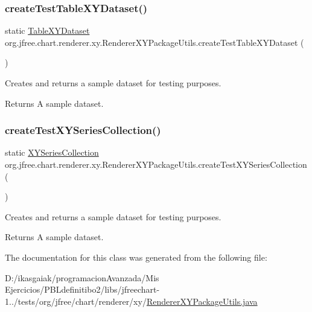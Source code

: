 \subsubsection{\texorpdfstring{create\+Test\+Table\+X\+Y\+Dataset()}{createTestTableXYDataset()}}
{\footnotesize\ttfamily static \mbox{\hyperlink{interfaceorg_1_1jfree_1_1data_1_1xy_1_1_table_x_y_dataset}{Table\+X\+Y\+Dataset}} org.\+jfree.\+chart.\+renderer.\+xy.\+Renderer\+X\+Y\+Package\+Utils.\+create\+Test\+Table\+X\+Y\+Dataset (\begin{DoxyParamCaption}{ }\end{DoxyParamCaption})\hspace{0.3cm}{\ttfamily [static]}}

Creates and returns a sample dataset for testing purposes.

\begin{DoxyReturn}{Returns}
A sample dataset. 
\end{DoxyReturn}
\mbox{\label{classorg_1_1jfree_1_1chart_1_1renderer_1_1xy_1_1_renderer_x_y_package_utils_a35efc8ca9354afb4dcedb39280bb0a60}} 
\subsubsection{\texorpdfstring{create\+Test\+X\+Y\+Series\+Collection()}{createTestXYSeriesCollection()}}
{\footnotesize\ttfamily static \mbox{\hyperlink{classorg_1_1jfree_1_1data_1_1xy_1_1_x_y_series_collection}{X\+Y\+Series\+Collection}} org.\+jfree.\+chart.\+renderer.\+xy.\+Renderer\+X\+Y\+Package\+Utils.\+create\+Test\+X\+Y\+Series\+Collection (\begin{DoxyParamCaption}{ }\end{DoxyParamCaption})\hspace{0.3cm}{\ttfamily [static]}}

Creates and returns a sample dataset for testing purposes.

\begin{DoxyReturn}{Returns}
A sample dataset. 
\end{DoxyReturn}


The documentation for this class was generated from the following file\+:\begin{DoxyCompactItemize}
\item 
D\+:/ikasgaiak/programacion\+Avanzada/\+Mis Ejercicios/\+P\+B\+Ldefinitibo2/libs/jfreechart-\/1../tests/org/jfree/chart/renderer/xy/\mbox{\hyperlink{_renderer_x_y_package_utils_8java}{Renderer\+X\+Y\+Package\+Utils.\+java}}\end{DoxyCompactItemize}
